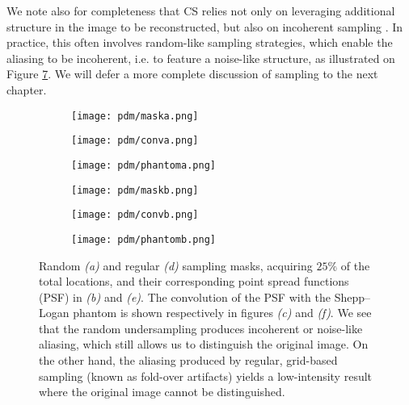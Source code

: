 We note also for completeness that CS relies not only on leveraging additional structure in the image to be reconstructed, but also on incoherent sampling \citep{lustig2008compressed}. In practice, this often involves random-like sampling strategies, which enable the aliasing to be incoherent, i.e. to feature a noise-like structure, as illustrated on Figure \ref{fig:aliasing}. We will defer a more complete discussion of sampling to the next chapter. 


\begin{figure}[ht!]
    \centering
    \begin{subfigure}[b]{0.2\textwidth}
        \centering
        \texttt{[image: pdm/maska.png]}
        \caption{}\label{fig:maska}
    \end{subfigure}
    \begin{subfigure}[b]{0.2\textwidth}
        \centering
        \texttt{[image: pdm/conva.png]}
        \caption{}\label{fig:conva}
    \end{subfigure}
    \begin{subfigure}[b]{0.2\textwidth}
        \centering
        \texttt{[image: pdm/phantoma.png]}
        \caption{}\label{fig:phantoma}
    \end{subfigure}

    \begin{subfigure}[b]{0.2\textwidth}
        \centering
        \texttt{[image: pdm/maskb.png]}
        \caption{}\label{fig:maskb}
    \end{subfigure}
    \begin{subfigure}[b]{0.2\textwidth}
        \centering
        \texttt{[image: pdm/convb.png]}
        \caption{}\label{fig:convb}
    \end{subfigure}
    \begin{subfigure}[b]{0.2\textwidth}
        \centering
        \texttt{[image: pdm/phantomb.png]}
        \caption{} \label{fig:phantomb}
    \end{subfigure}
    
    \caption{Random \textit{(a)} and regular \textit{(d)} sampling masks, acquiring $25\%$ of the total locations, and their corresponding point spread functions (PSF) in \textit{(b)} and \textit{(e)}. The convolution of the PSF with the Shepp–Logan phantom is shown respectively in figures \textit{(c)} and \textit{(f)}. We see that the random undersampling produces incoherent or noise-like aliasing, which still allows us to distinguish the original image. On the other hand, the aliasing produced by regular, grid-based sampling (known as fold-over artifacts) yields a low-intensity result where the original image cannot be distinguished.} \label{fig:aliasing}
\end{figure}

